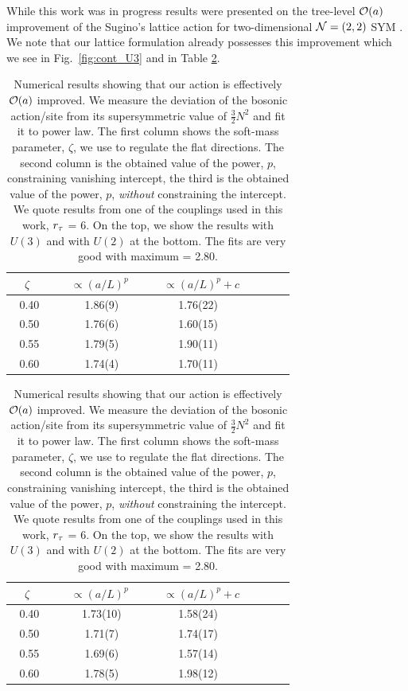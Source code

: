 While this work was in progress results were presented on the tree-level $\mathcal O(a)$ improvement of the Sugino's lattice action for two-dimensional $\mathcal N = (2, 2)$ SYM \cite{Hanada:2017gqc}.
We note that our lattice formulation already possesses this improvement which we see in Fig.~\ref{fig:cont_U3} and in
Table \ref{table:order_a}.



\begin{table}[htbp]
   \vspace{10mm}
      \centering
 \begin{tabular}{cccccc}
\hline \hline
\ \ $\zeta$ \ \ & \ \ $\propto (a/L)^{p} $ \ \ & \ $\propto (a/L)^{p} + c $ \\
\hline
0.40 & 1.86(9) & 1.76(22) & \ \ \\
0.50 & 1.76(6) & 1.60(15) & \ \ \\
0.55 & 1.79(5) & 1.90(11) &  \ \ \\
0.60 & 1.74(4) & 1.70(11) &   \ \ \\
\hline
  
  
  
\end{tabular}
      \centering
 \begin{tabular}{cccccc}

\hline \hline
\ \ $\zeta$ \ \ & \ \ $\propto (a/L)^{p} $ \ \ & \ $\propto (a/L)^{p} + c $ \\
\hline
0.40 & 1.73(10) & 1.58(24) & \ \ \\
0.50 & 1.71(7) & 1.74(17) & \\
0.55 & 1.69(6) & 1.57(14) &  \ \ \\
0.60 & 1.78(5) & 1.98(12) &   \ \ \\
\hline
\end{tabular}

\caption{\label{table:order_a}Numerical results showing that our action is effectively $\mathcal O(a)$ improved. We measure the deviation of the bosonic action/site from its supersymmetric value of $\frac{3}{2}N^2$ and fit it to power law. The first column shows the soft-mass parameter, $\zeta$, we use to regulate the flat directions. The second column is the obtained value of the power, $p$, constraining vanishing intercept, the third is the obtained value of the power, $p$, \emph{without} constraining the intercept. We quote results from one of the couplings used in this work, ${r_{\tau}}$ = 6. On the top, we show the results with $U(3)$ and with $U(2)$ at the bottom. The fits are very good with maximum \CHI = 2.80.}
\end{table}


